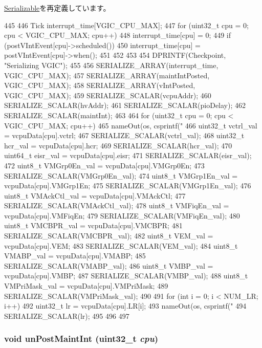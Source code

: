 \hyperlink{classSerializable_ad6272f80ae37e8331e3969b3f072a801}{Serializable}を再定義しています。


\begin{DoxyCode}
445 {
446     Tick interrupt_time[VGIC_CPU_MAX];
447     for (uint32_t cpu = 0; cpu < VGIC_CPU_MAX; cpu++) {
448         interrupt_time[cpu] = 0;
449         if (postVIntEvent[cpu]->scheduled()) {
450             interrupt_time[cpu] = postVIntEvent[cpu]->when();
451         }
452     }
453 
454     DPRINTF(Checkpoint, "Serializing VGIC\n");
455 
456     SERIALIZE_ARRAY(interrupt_time, VGIC_CPU_MAX);
457     SERIALIZE_ARRAY(maintIntPosted, VGIC_CPU_MAX);
458     SERIALIZE_ARRAY(vIntPosted, VGIC_CPU_MAX);
459     SERIALIZE_SCALAR(vcpuAddr);
460     SERIALIZE_SCALAR(hvAddr);
461     SERIALIZE_SCALAR(pioDelay);
462     SERIALIZE_SCALAR(maintInt);
463 
464     for (uint32_t cpu = 0; cpu < VGIC_CPU_MAX; cpu++) {
465         nameOut(os, csprintf("%
466         uint32_t vctrl_val = vcpuData[cpu].vctrl;
467         SERIALIZE_SCALAR(vctrl_val);
468         uint32_t hcr_val = vcpuData[cpu].hcr;
469         SERIALIZE_SCALAR(hcr_val);
470         uint64_t eisr_val = vcpuData[cpu].eisr;
471         SERIALIZE_SCALAR(eisr_val);
472         uint8_t VMGrp0En_val = vcpuData[cpu].VMGrp0En;
473         SERIALIZE_SCALAR(VMGrp0En_val);
474         uint8_t VMGrp1En_val = vcpuData[cpu].VMGrp1En;
475         SERIALIZE_SCALAR(VMGrp1En_val);
476         uint8_t VMAckCtl_val = vcpuData[cpu].VMAckCtl;
477         SERIALIZE_SCALAR(VMAckCtl_val);
478         uint8_t VMFiqEn_val = vcpuData[cpu].VMFiqEn;
479         SERIALIZE_SCALAR(VMFiqEn_val);
480         uint8_t VMCBPR_val = vcpuData[cpu].VMCBPR;
481         SERIALIZE_SCALAR(VMCBPR_val);
482         uint8_t VEM_val = vcpuData[cpu].VEM;
483         SERIALIZE_SCALAR(VEM_val);
484         uint8_t VMABP_val = vcpuData[cpu].VMABP;
485         SERIALIZE_SCALAR(VMABP_val);
486         uint8_t VMBP_val = vcpuData[cpu].VMBP;
487         SERIALIZE_SCALAR(VMBP_val);
488         uint8_t VMPriMask_val = vcpuData[cpu].VMPriMask;
489         SERIALIZE_SCALAR(VMPriMask_val);
490 
491         for (int i = 0; i < NUM_LR; i++) {
492             uint32_t lr = vcpuData[cpu].LR[i];
493             nameOut(os, csprintf("%
494             SERIALIZE_SCALAR(lr);
495         }
496     }
497 }
\end{DoxyCode}
\hypertarget{classVGic_ae2afe0f63a211fe5f6cc56bbe8b4d79a}{
\subsubsection[{unPostMaintInt}]{\setlength{\rightskip}{0pt plus 5cm}void unPostMaintInt ({\bf uint32\_\-t} {\em cpu})}}
\label{classVGic_ae2afe0f63a211fe5f6cc56bbe8b4d79a}



